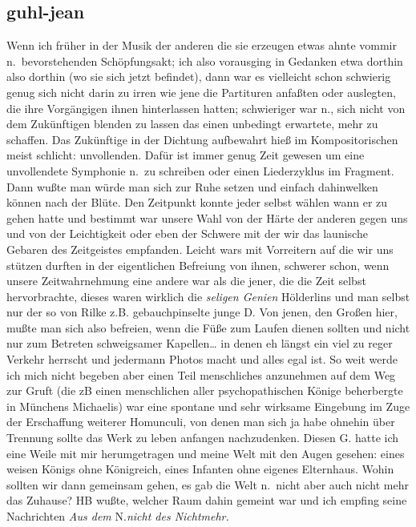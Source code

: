\documentclass[
]{article}
\author{}
\date{\vspace{-2.5em}}
\begin{document}
\subsection{guhl-jean}\label{guhl-jean}

Wenn ich früher in der Musik der anderen die sie erzeugen etwas ahnte
vommir n.~bevorstehenden Schöpfungsakt; ich also vorausging in Gedanken
etwa dorthin also dorthin (wo sie sich jetzt befindet), dann war es
vielleicht schon schwierig genug sich nicht darin zu irren wie jene die
Partituren anfaßten oder auslegten, die ihre Vorgängigen ihnen
hinterlassen hatten; schwieriger war n., sich nicht von dem Zukünftigen
blenden zu lassen das einen unbedingt erwartete, mehr zu schaffen. Das
Zukünftige in der Dichtung aufbewahrt hieß im Kompositorischen meist
schlicht: unvollenden. Dafür ist immer genug Zeit gewesen um eine
unvollendete Symphonie n.~zu schreiben oder einen Liederzyklus im
Fragment. Dann wußte man würde man sich zur Ruhe setzen und einfach
dahinwelken können nach der Blüte. Den Zeitpunkt konnte jeder selbst
wählen wann er zu gehen hatte und bestimmt war unsere Wahl von der Härte
der anderen gegen uns und von der Leichtigkeit oder eben der Schwere mit
der wir das launische Gebaren des Zeitgeistes empfanden. Leicht wars mit
Vorreitern auf die wir uns stützen durften in der eigentlichen Befreiung
von ihnen, schwerer schon, wenn unsere Zeitwahrnehmung eine andere war
als die jener, die die Zeit selbst hervorbrachte, dieses waren wirklich
die \emph{seligen Genien} Hölderlins und man selbst nur der so von Rilke
z.B. gebauchpinselte junge D. Von jenen, den Großen hier, mußte man sich
also befreien, wenn die Füße zum Laufen dienen sollten und nicht nur zum
Betreten schweigsamer Kapellen\ldots{} in denen eh längst ein viel zu
reger Verkehr herrscht und jedermann Photos macht und alles egal ist. So
weit werde ich mich nicht begeben aber einen Teil menschliches
anzunehmen auf dem Weg zur Gruft (die zB einen menschlichen aller
psychopathischen Könige beherbergte in Münchens Michaelis) war eine
spontane und sehr wirksame Eingebung im Zuge der Erschaffung weiterer
Homunculi, von denen man sich ja habe ohnehin über Trennung sollte das
Werk zu leben anfangen nachzudenken. Diesen G. hatte ich eine Weile mit
mir herumgetragen und meine Welt mit den Augen gesehen: eines weisen
Königs ohne Königreich, eines Infanten ohne eigenes Elternhaus. Wohin
sollten wir dann gemeinsam gehen, es gab die Welt n.~nicht aber auch
nicht mehr das Zuhause? HB wußte, welcher Raum dahin gemeint war und ich
empfing seine Nachrichten \emph{Aus dem }N.\emph{nicht des Nichtmehr.}
\end{document}
